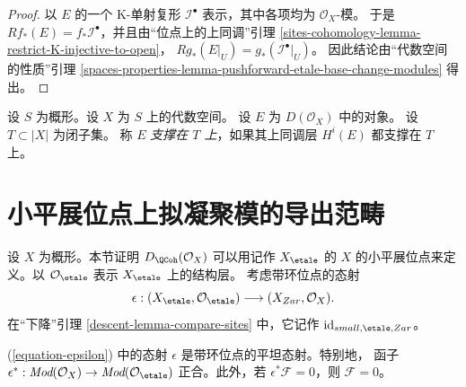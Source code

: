 \begin{proof}
以 $E$ 的一个 K-单射复形 $\mathcal{I}^\bullet$ 表示，其中各项均为
$\mathcal{O}_X$-模。
于是 $Rf_*(E) = f_*\mathcal{I}^\bullet$，并且由“位点上的上同调”引理
\ref{sites-cohomology-lemma-restrict-K-injective-to-open}，
$Rg_*(E|_U) = g_*(\mathcal{I}^\bullet|_U)$。
因此结论由“代数空间的性质”引理
\ref{spaces-properties-lemma-pushforward-etale-base-change-modules} 得出。
\end{proof}


\begin{definition}
\label{definition-supported-on}
设 $S$ 为概形。设 $X$ 为 $S$ 上的代数空间。
设 $E$ 为 $D(\mathcal{O}_X)$ 中的对象。
设 $T \subset |X|$ 为闭子集。
称 $E$ {\it 支撑在 $T$ 上}，如果其上同调层 $H^i(E)$ 都支撑在 $T$ 上。
\end{definition}

\section{小平展位点上拟凝聚模的导出范畴}
\label{section-derived-quasi-coherent-etale}

\noindent
设 $X$ 为概形。本节证明 $D_\QCoh(\mathcal{O}_X)$ 可以用记作
$X_\etale$ 的 $X$ 的小平展位点来定义。以 $\mathcal{O}_\etale$ 表示
$X_\etale$ 上的结构层。
考虑带环位点的态射
\begin{equation}
\label{equation-epsilon}
\epsilon :
(X_\etale, \mathcal{O}_\etale)
\longrightarrow
(X_{Zar}, \mathcal{O}_X).
\end{equation}
在“下降”引理 \ref{descent-lemma-compare-sites} 中，它记作
$\text{id}_{small, \etale, Zar}$。

\begin{lemma}
\label{lemma-epsilon-flat}
(\ref{equation-epsilon}) 中的态射 $\epsilon$ 是带环位点的平坦态射。特别地，
函子
$\epsilon^* : \textit{Mod}(\mathcal{O}_X) \to
\textit{Mod}(\mathcal{O}_\etale)$ 正合。此外，若
$\epsilon^*\mathcal{F} = 0$，则 $\mathcal{F} = 0$。
\end{lemma}

